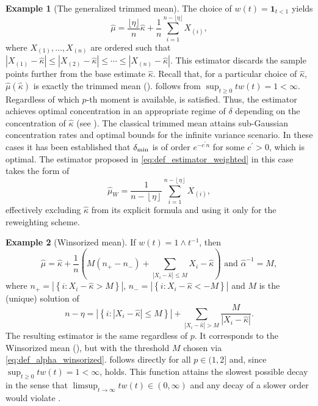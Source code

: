 \documentclass{article}
\theoremstyle{plain}
\theoremstyle{definition}
\newtheorem{example}{Example}
\begin{document}
\begin{example}[The generalized trimmed mean]\label{ex:rho_atm} The choice of $w(t) = \mathbf{1}_{t < 1}$ yields
  \[ \widehat{\mu} = \frac{\lfloor \eta \rfloor}{n}\widehat{\kappa} + \frac{1}{n} \sum_{i=1}^{n - \lfloor \eta \rfloor} X_{(i)},    \]
where $X_{(1)}, \ldots, X_{(n)}$ are ordered such that $|X_{(1)} - \widehat{\kappa}| \leq |X_{(2)} - \widehat{\kappa}| \leq \cdots \leq |X_{(n)} - \widehat{\kappa}|$. This estimator discards the sample points further from the base estimate $\widehat{\kappa}$. Recall that, for a particular choice of \( \widehat{\kappa }  \), \( \widehat{\mu} (\widehat{\kappa } )  \) is exactly the trimmed mean ().  follows from $\sup_{t \geq 0} t w(t) = 1 < \infty$. Regardless of which $p$-th moment is available,  is satisfied. Thus, the estimator achieves optimal concentration in an appropriate regime of \( \delta  \) depending on the concentration of \( \widehat{\kappa }  \) (see ). The classical trimmed mean \citep{oliveira2025finite} attains sub-Gaussian concentration rates and optimal bounds for the infinite variance scenario. In these cases it has been established that $\delta_{\textup{min}}$ is of order $e^{-c^\prime n}$ for some $c^\prime>0$, which is optimal. The estimator proposed in \eqref{eq:def_estimator_weighted} in this case takes the form of \[
  \widehat{\mu }_W = \frac{1}{n-\left\lfloor \eta  \right\rfloor }\sum_{i=1}^{n-\left\lfloor \eta  \right\rfloor} X_{(i)},
  \] 
  effectively excluding \( \widehat{\kappa }  \) from its explicit formula and using it only for the reweighting scheme. %
\end{example}


\begin{example}[Winsorized mean]\label{ex:rho_win} If $w(t) = 1 \wedge t^{-1}$, then
	\begin{equation}
		\label{eq:def_estimator_winsorized}
		\widehat{\mu} = \widehat{\kappa} + \frac{1}{n} \left( M(n_+ - n_-) + \sum_{|X_i - \widehat{\kappa}| \leq M} X_i - \widehat{\kappa}\right) \text{ and } \widehat{\alpha}^{-1} = M,
	\end{equation}
	where $n_+ = \left|\left\{ i : X_i - \widehat{\kappa} > M \right\}\right|$, $n_- = \left|\left\{ i : X_i - \widehat{\kappa} < -M \right\}\right|$ and $M$ is the (unique) solution of
	\begin{equation}
		\label{eq:def_alpha_winsorized}
		n - \eta = \left| \left\{ i : |X_i - \widehat{\kappa}| \leq M \right\} \right| +  \sum_{
			|X_i - \widehat{\kappa}| > M } \frac{M}{|X_i - \widehat{\kappa}|}.
	\end{equation}
	The resulting estimator is the same regardless of $p$. It corresponds to the Winsorized mean (\cite{huber1964robust}), but with the threshold $M$ chosen via \eqref{eq:def_alpha_winsorized}.  follows directly for all $p\in(1,2]$ and, since $\sup_{t\geq0} tw(t) = 1 < \infty$,  holds. This function attains the slowest possible decay in the sense that $\limsup_{t\to\infty}tw(t)\in(0,\infty)$ and any decay of a slower order would violate .
\end{example}
\end{document}
